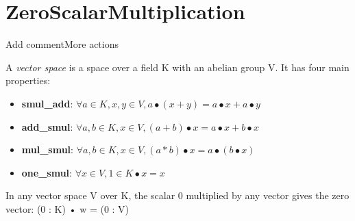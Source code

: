 \section{ZeroScalarMultiplication}Add commentMore actions

\begin{definition}
  \label{definition : VectorSpace}
  \leanok
  A \emph{vector space} is a space over a field K with an abelian group V. It has four main properties:
  \begin{itemize}
    \item \textbf{smul\_add}:
    $\forall a \in K, x,y \in V , a \bullet (x + y) = a \bullet x + a \bullet y $
    \item \textbf{add\_smul}:
    $\forall a,b \in K, x \in V, (a + b) \bullet x = a \bullet x + b \bullet x $
    \item \textbf{mul\_smul}:
    $\forall a,b \in K, x \in V, (a * b) \bullet x = a \bullet (b \bullet x) $
    \item \textbf{one\_smul}:
    $\forall x \in V, 1 \in K \bullet x = x $
  \end{itemize}
\end{definition}

\begin{theorem}
  \label{theorem : zero_smul}
  \leanok
  In any vector space V over K, the scalar 0 multiplied by any vector gives the zero vector: (0 : K) • w = (0 : V)
\end{theorem}
